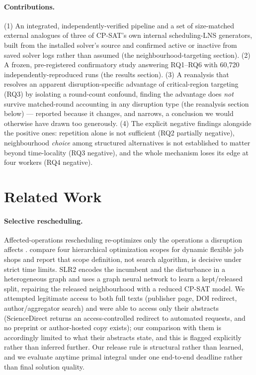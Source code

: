 \documentclass[letterpaper]{article} %
\begin{document}
\paragraph{Contributions.} (1) An integrated, independently-verified pipeline and a set of size-matched external analogues of three of CP-SAT's own internal scheduling-LNS generators, built from the installed solver's source and confirmed active or inactive from saved solver logs rather than assumed (the neighbourhood-targeting section). (2) A frozen, pre-registered confirmatory study answering RQ1--RQ6 with 60{,}720 independently-reproduced runs (the results section). (3) A reanalysis that resolves an apparent disruption-specific advantage of critical-region targeting (RQ3) by isolating a round-count confound, finding the advantage does \emph{not} survive matched-round accounting in any disruption type (the reanalysis section below) --- reported because it changes, and narrows, a conclusion we would otherwise have drawn too generously. (4) The explicit negative findings alongside the positive ones: repetition alone is not sufficient (RQ2 partially negative), neighbourhood \emph{choice} among structured alternatives is not established to matter beyond time-locality (RQ3 negative), and the whole mechanism loses its edge at four workers (RQ4 negative).

\section{Related Work}

\paragraph{Selective rescheduling.} Affected-operations rescheduling re-optimizes only the operations a disruption affects \citep{abumaizar1997,subramaniam2003}. \citet{sun2026} compare four hierarchical optimization scopes for dynamic flexible job shops and report that scope definition, not search algorithm, is decisive under strict time limits. SLR2 \citep{linyang2026} encodes the incumbent and the disturbance in a heterogeneous graph and uses a graph neural network to learn a kept/released split, repairing the released neighbourhood with a reduced CP-SAT model. We attempted legitimate access to both full texts (publisher page, DOI redirect, author/aggregator search) and were able to access only their abstracts (ScienceDirect returns an access-controlled redirect to automated requests, and no preprint or author-hosted copy exists); our comparison with them is accordingly limited to what their abstracts state, and this is flagged explicitly rather than inferred further. Our release rule is structural rather than learned, and we evaluate anytime primal integral under one end-to-end deadline rather than final solution quality.
\end{document}
